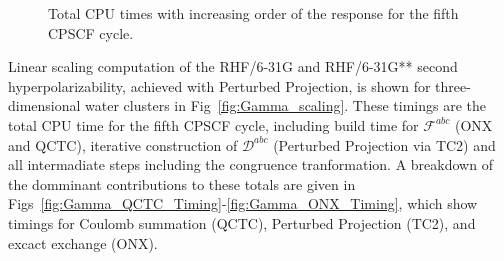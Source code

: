 \documentclass[prl,aps,letterpaper,twocolumn,showpacs,twocolumngrid,superbib]{revtex4}
\def\F{\mathcal{F}}
\def\D{\mathcal{D}}
\begin{document}
\begin{figure}[h]
  \caption{Total CPU times with increasing order of the response for 
           the fifth CPSCF cycle.}
\end{figure}

Linear scaling computation of the RHF/6-31G and RHF/6-31G** second hyperpolarizability,
achieved with Perturbed Projection, is shown for three-dimensional water clusters 
in Fig~\ref{fig:Gamma_scaling}.  These timings are the total CPU time for the fifth CPSCF cycle, 
including build time for $\F^{abc}$ ({\sc ONX} and {\sc QCTC}), 
iterative construction of $\D^{abc}$ (Perturbed Projection via {\sc TC2}) and all intermadiate
steps including the congruence tranformation.
A breakdown of the domminant contributions to these totals are given
in Figs~\ref{fig:Gamma_QCTC_Timing}-\ref{fig:Gamma_ONX_Timing}, which show timings for Coulomb 
summation ({\sc QCTC}), Perturbed Projection ({\sc TC2}), and excact exchange ({\sc ONX}).
\end{document}

